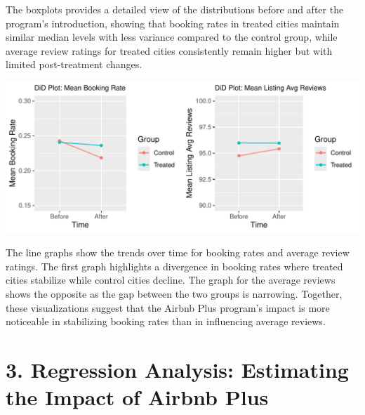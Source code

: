 \documentclass[
  12pt,
]{article}
\begin{document}
The boxplots provides a detailed view of the distributions before and
after the program's introduction, showing that booking rates in treated
cities maintain similar median levels with less variance compared to the
control group, while average review ratings for treated cities
consistently remain higher but with limited post-treatment changes.

\includegraphics{assignment2_final_2_files/figure-latex/unnamed-chunk-15-1.pdf}

The line graphs show the trends over time for booking rates and average
review ratings. The first graph highlights a divergence in booking rates
where treated cities stabilize while control cities decline. The graph
for the average reviews shows the opposite as the gap between the two
groups is narrowing. Together, these visualizations suggest that the
Airbnb Plus program's impact is more noticeable in stabilizing booking
rates than in influencing average reviews.

\section{3. Regression Analysis: Estimating the Impact of Airbnb
Plus}\label{regression-analysis-estimating-the-impact-of-airbnb-plus}
\end{document}
